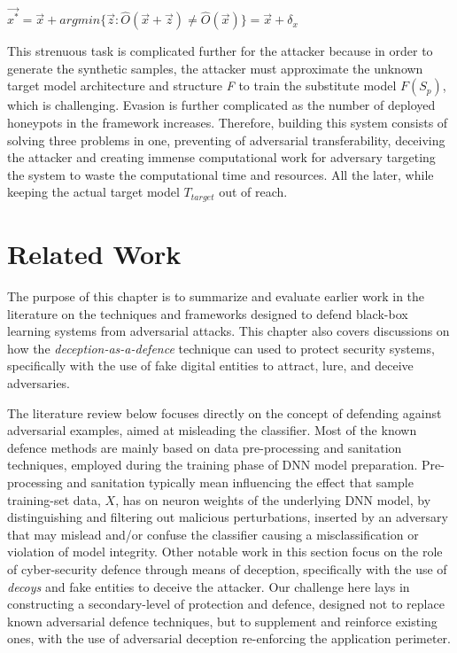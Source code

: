 \documentclass[grad,lot,lof,11pt,oneside,onehalfspace]{RUthesis}
\begin{document}
\centerline{$\vec{x^{*}} = \vec{x} + argmin\{\vec{z}:\hat{O}(\vec{x}+\vec{z})\neq\hat{O}(\vec{x})\}= \vec{x} + \delta_{x}$}
\newline
This strenuous task is complicated further for the attacker because in order to generate the synthetic samples, the attacker must approximate the unknown target model architecture and structure \textit{F} to train the substitute model \textit{$F(S_{p})$}, which is challenging. Evasion is further complicated as the number of deployed honeypots in the framework increases. \newline
Therefore, building this system consists of solving three problems in one, preventing of adversarial transferability, deceiving the attacker and creating immense computational work for adversary targeting the system to waste the computational time and resources. All the later, while keeping the actual target model \textit{$T_{target}$} out of reach.



\chapter{Related Work}
The purpose of this chapter is to summarize and evaluate  earlier work in the literature on the techniques and frameworks designed to defend black-box learning systems from adversarial attacks. This chapter also covers discussions  on how the \textit{deception-as-a-defence} technique can used to protect security systems, specifically with the use of fake digital entities to attract, lure, and deceive adversaries.

The literature review below focuses directly on the concept of defending against adversarial examples, aimed at misleading the classifier. Most of the known defence methods are mainly based on data pre-processing and sanitation techniques, employed during the training phase of  DNN model preparation. Pre-processing and sanitation typically mean influencing the effect that sample training-set data, \textit{$X$}, has on neuron weights of the underlying DNN model, by  distinguishing and filtering out malicious perturbations, inserted by an adversary that may mislead and/or confuse the classifier causing a misclassification or violation of model integrity. Other notable work in this section focus on the role of cyber-security defence through means of deception, specifically with the use of \textit{decoys} and fake entities to deceive the attacker. Our challenge here lays in constructing a secondary-level of protection and defence, designed not to replace known adversarial defence techniques,  but to supplement and reinforce existing ones, with the use of adversarial deception re-enforcing the application perimeter. 
\end{document}
